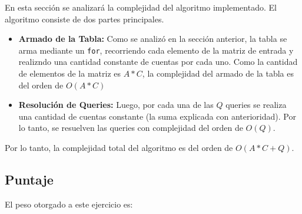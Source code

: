 En esta sección se analizará la complejidad del algoritmo implementado. El algoritmo consiste de dos partes principales.

\begin{itemize}
    \item \textbf{Armado de la Tabla:} Como se analizó en la sección anterior, la tabla se arma mediante un \texttt{for}, recorriendo cada elemento de la matriz de entrada y realizndo una cantidad constante de cuentas por cada uno. Como la cantidad de elementos de la matriz es $A*C$, la complejidad del armado de la tabla es del orden de $O(A*C)$
    \item \textbf{Resolución de Queries:} Luego, por cada una de las $Q$ queries se realiza una cantidad de cuentas constante (la suma explicada con anterioridad). Por lo tanto, se resuelven las queries con complejidad del orden de $O(Q)$.
\end{itemize}

Por lo tanto, la complejidad total del algoritmo es del orden de $O(A*C + Q)$. 

\subsection{Puntaje}
El peso otorgado a este ejercicio es:
